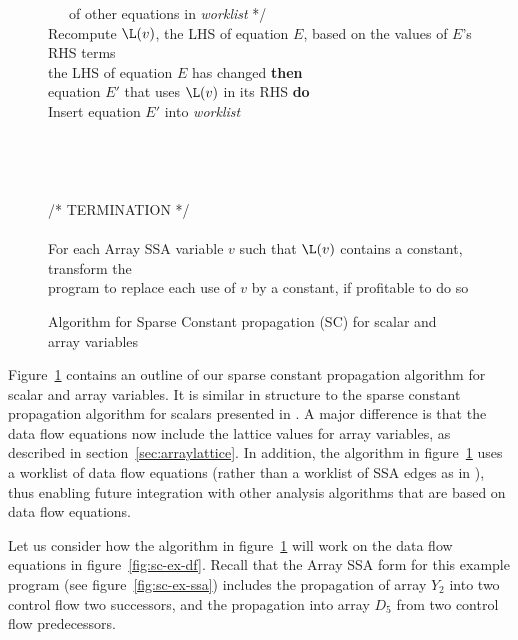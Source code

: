 \begin{figure}
\begin{center}
\begin{programa}
\Tb ~~~of other equations in {\it worklist} */ \\
\Tb Recompute $\L(v)$, the LHS of equation $E$, based on the values of $E$'s RHS terms\\
 the LHS of equation $E$ has changed {\bf then}\\
 equation $E'$ that uses $\L(v)$ in its RHS {\bf do}\\
\Td Insert equation $E'$ into {\it worklist}\\
\\
\\
 \\
\\
/* TERMINATION */\\
\\
\Ta For each Array SSA variable $v$ such that $\L(v)$ contains a constant, transform the \\ 
\Ta program to replace each use of $v$ by a constant, if profitable to do so
\end{programa}
\end{center}
\caption{Algorithm for Sparse Constant propagation (SC) for scalar and array variables}
\label{fig:sc-alg}
\end{figure}

Figure~\ref{fig:sc-alg} contains an outline of our sparse constant
propagation algorithm for scalar and array variables.  It is similar in
structure to the sparse constant propagation algorithm for scalars
presented in \cite{WeZa91}.  A major difference is that the data flow
equations now include the lattice values for array variables, as
described in section~\ref{sec:arraylattice}.
In addition, the algorithm in figure~\ref{fig:sc-alg} uses a worklist
of data flow equations (rather than a worklist of SSA edges as in \cite{WeZa91}), thus enabling future integration with other analysis algorithms that are
based on data flow equations.

Let us consider how the algorithm in figure~\ref{fig:sc-alg}
will work on the data flow equations in figure~\ref{fig:sc-ex-df}.
Recall that the Array SSA form for this example program 
(see figure~\ref{fig:sc-ex-ssa})
includes the propagation of array $Y_2$ into two control
flow two successors, and the propagation into array $D_5$
from two control flow
predecessors. 


